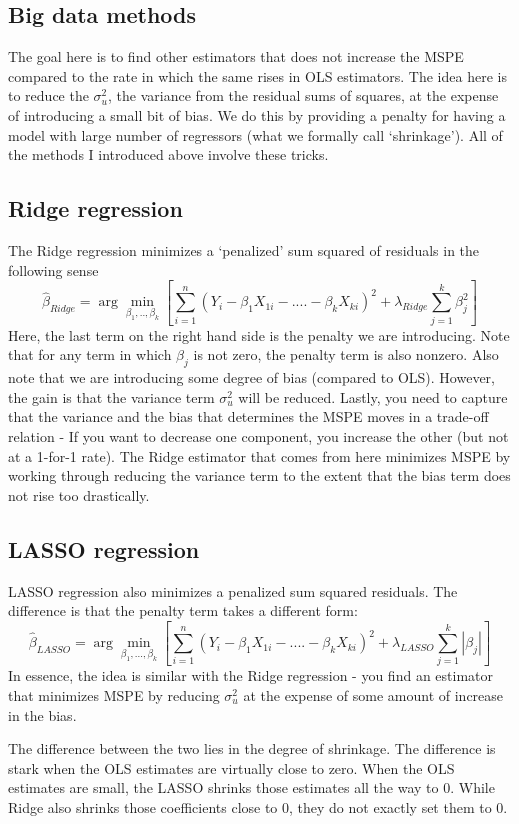 \documentclass[12pt]{article}
\theoremstyle{definition}
\theoremstyle{property}
\theoremstyle{assumption}
\theoremstyle{example}
\theoremstyle{comment}
\begin{document}
\subsection{Big data methods}
The goal here is to find other estimators that does not increase the MSPE compared to the rate in which the same rises in OLS estimators. The idea here is to reduce the $\sigma_u^2$, the variance from the residual sums of squares, at the expense of introducing a small bit of bias. We do this by providing a penalty for having a model with large number of regressors (what we formally call `shrinkage'). All of the methods I introduced above involve these tricks. 
\subsection{Ridge regression}
The Ridge regression minimizes a `penalized' sum squared of residuals in the following sense
\[
\hat{\beta}_{Ridge}=\arg\min_{\beta_1,..,\beta_k}\left[ \sum_{i=1}^n(Y_i - \beta_1X_{1i}-....-\beta_kX_{ki})^2 + \lambda_{Ridge}\sum_{j=1}^k\beta_j^2\right]
\]
Here, the last term on the right hand side is the penalty we are introducing. Note that for any term in which $\beta_j$ is not zero, the penalty term is also nonzero. Also note that we are introducing some degree of bias (compared to OLS). However, the gain is that the variance term $\sigma_u^2$ will be reduced. Lastly, you need to capture that the variance and the bias that determines the MSPE moves in a trade-off relation - If you want to decrease one component, you increase the other (but not at a 1-for-1 rate). The Ridge estimator that comes from here minimizes MSPE by working through reducing the variance term to the extent that the bias term does not rise too drastically. 

\subsection{LASSO regression}
LASSO regression also minimizes a penalized sum squared residuals. The difference is that the penalty term takes a different form: 
\[
\hat{\beta}_{LASSO}=\arg\min_{\beta_1,...,\beta_k}\left[ \sum_{i=1}^n(Y_i - \beta_1X_{1i}-....-\beta_kX_{ki})^2 + \lambda_{LASSO}\sum_{j=1}^k |\beta_j|\right]
\]
In essence, the idea is similar with the Ridge regression - you find an estimator that minimizes MSPE by reducing $\sigma_u^2$ at the expense of some amount of increase in the bias. 
\par\medskip
The difference between the two lies in the degree of shrinkage. The difference is stark when the OLS estimates are virtually close to zero. When the OLS estimates are small, the LASSO shrinks those estimates all the way to 0. While Ridge also shrinks those coefficients close to 0, they do not exactly set them to 0. 
\end{document}
